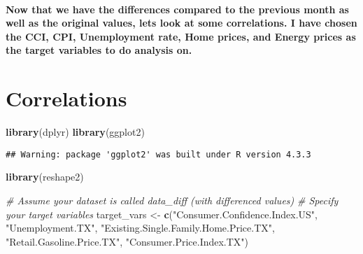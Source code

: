 \documentclass[
]{article}
\newenvironment{Shaded}{\begin{snugshade}}{\end{snugshade}}
\newcommand{\CommentTok}[1]{\textcolor[rgb]{0.56,0.35,0.01}{\textit{#1}}}
\newcommand{\FunctionTok}[1]{\textcolor[rgb]{0.13,0.29,0.53}{\textbf{#1}}}
\newcommand{\NormalTok}[1]{#1}
\newcommand{\OtherTok}[1]{\textcolor[rgb]{0.56,0.35,0.01}{#1}}
\newcommand{\StringTok}[1]{\textcolor[rgb]{0.31,0.60,0.02}{#1}}
\begin{document}
\hypertarget{now-that-we-have-the-differences-compared-to-the-previous-month-as-well-as-the-original-values-lets-look-at-some-correlations.-i-have-chosen-the-cci-cpi-unemployment-rate-home-prices-and-energy-prices-as-the-target-variables-to-do-analysis-on.}{%
\paragraph{Now that we have the differences compared to the previous
month as well as the original values, lets look at some correlations. I
have chosen the CCI, CPI, Unemployment rate, Home prices, and Energy
prices as the target variables to do analysis
on.}\label{now-that-we-have-the-differences-compared-to-the-previous-month-as-well-as-the-original-values-lets-look-at-some-correlations.-i-have-chosen-the-cci-cpi-unemployment-rate-home-prices-and-energy-prices-as-the-target-variables-to-do-analysis-on.}}

\hypertarget{correlations}{%
\section{Correlations}\label{correlations}}

\begin{Shaded}
\begin{Highlighting}[]
\FunctionTok{library}\NormalTok{(dplyr)}
\FunctionTok{library}\NormalTok{(ggplot2)}
\end{Highlighting}
\end{Shaded}

\begin{verbatim}
## Warning: package 'ggplot2' was built under R version 4.3.3
\end{verbatim}

\begin{Shaded}
\begin{Highlighting}[]
\FunctionTok{library}\NormalTok{(reshape2)}

\CommentTok{\# Assume your dataset is called \textquotesingle{}data\_diff\textquotesingle{} (with differenced values)}
\CommentTok{\# Specify your target variables}
\NormalTok{target\_vars }\OtherTok{\textless{}{-}} \FunctionTok{c}\NormalTok{(}\StringTok{"Consumer.Confidence.Index.US"}\NormalTok{, }\StringTok{"Unemployment.TX"}\NormalTok{, }
                 \StringTok{"Existing.Single.Family.Home.Price.TX"}\NormalTok{, }
                 \StringTok{"Retail.Gasoline.Price.TX"}\NormalTok{, }
                 \StringTok{"Consumer.Price.Index.TX"}\NormalTok{)}
\end{Highlighting}
\end{Shaded}
\end{document}

